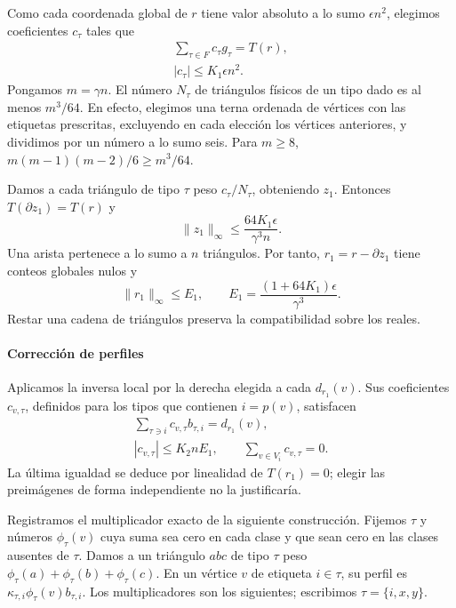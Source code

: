 \documentclass[spanish,11pt,a4paper]{article}
\begin{document}
Como cada coordenada global de \(r\) tiene valor absoluto a lo sumo \(\epsilon n^2\), elegimos coeficientes \(c_\tau\) tales que \[\begin{gathered}
\sum_{\tau\in F}c_\tau g_\tau=T(r),\\
|c_\tau|\le K_1\epsilon n^2.
\end{gathered}\] Pongamos \(m=\gamma n\). El número \(N_\tau\) de triángulos físicos de un tipo dado es al menos \(m^3/64\). En efecto, elegimos una terna ordenada de vértices con las etiquetas prescritas, excluyendo en cada elección los vértices anteriores, y dividimos por un número a lo sumo seis. Para \(m\ge8\), \(m(m-1)(m-2)/6\ge m^3/64\).

Damos a cada triángulo de tipo \(\tau\) peso \(c_\tau/N_\tau\), obteniendo \(z_1\). Entonces \(T(\partial z_1)=T(r)\) y \[\|z_1\|_\infty\le\frac{64K_1\epsilon}{\gamma^3n}.\] Una arista pertenece a lo sumo a \(n\) triángulos. Por tanto, \(r_1=r-\partial z_1\) tiene conteos globales nulos y \[\|r_1\|_\infty\le E_1,
\qquad E_1=\frac{(1+64K_1)\epsilon}{\gamma^3}.
\tag{A.2.2}\] Restar una cadena de triángulos preserva la compatibilidad sobre los reales.

\paragraph{Corrección de perfiles}\label{correcciuxf3n-de-perfiles}

Aplicamos la inversa local por la derecha elegida a cada \(d_{r_1}(v)\). Sus coeficientes \(c_{v,\tau}\), definidos para los tipos que contienen \(i=p(v)\), satisfacen \[\begin{gathered}
\sum_{\tau\ni i}c_{v,\tau}b_{\tau,i}=d_{r_1}(v),\\
|c_{v,\tau}|\le K_2nE_1,
\qquad \sum_{v\in V_i}c_{v,\tau}=0.
\end{gathered}
\tag{A.2.3}\] La última igualdad se deduce por linealidad de \(T(r_1)=0\); elegir las preimágenes de forma independiente no la justificaría.

Registramos el multiplicador exacto de la siguiente construcción. Fijemos \(\tau\) y números \(\phi_\tau(v)\) cuya suma sea cero en cada clase y que sean cero en las clases ausentes de \(\tau\). Damos a un triángulo \(abc\) de tipo \(\tau\) peso \(\phi_\tau(a)+\phi_\tau(b)+\phi_\tau(c)\). En un vértice \(v\) de etiqueta \(i\in\tau\), su perfil es \(\kappa_{\tau,i}\phi_\tau(v)b_{\tau,i}\). Los multiplicadores son los siguientes; escribimos \(\tau=\{i,x,y\}\).
\end{document}
